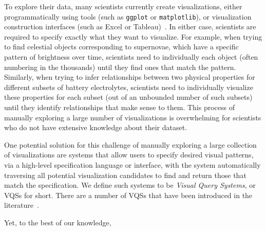 To explore their data, many scientists currently
create visualizations, either programmatically using 
tools (such as {\tt ggplot} or {\tt matplotlib}),
or visualization construction interfaces (such as 
Excel or Tableau)~\cite{Momcheva2015,Prabhu2011}.
In either case, scientists are required to specify exactly what
they want to visualize.  For example, when trying to find celestial objects
corresponding to supernovae, which have a specific pattern
of brightness over time, scientists
need to individually  each object (often numbering in the thousands) until they find ones that match the pattern. Similarly, when trying to infer relationships between two physical properties for different subsets of battery electrolytes, scientists need to individually visualize these properties
for each subset (out of an unbounded number of such subsets)
until they identify relationships that make sense to them. This process of manually exploring a large number of visualizations 
is  overwhelming for scientists who do not have extensive knowledge about their
dataset. 
\par One potential solution for this challenge of manually exploring a large collection of visualizations
are systems that allow users to specify 
desired visual patterns, via a high-level specification language
or interface, with the system automatically
traversing all potential visualization candidates to find
and return those that match the specification. 
We define such systems to be {\em Visual Query Systems}, or VQSs for short.
There are a number of VQSs that have been introduced in the literature~\cite{googlecorrelate,Hochheiser2004,wattenberg2001sketching,Siddiqui2017VLDB,ryall2005querylines}. 
\par {}
Yet, to the best of our knowledge, 

